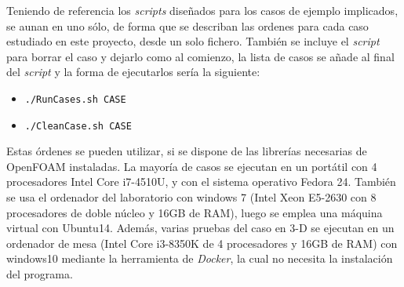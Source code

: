 Teniendo de referencia los \emph{scripts} diseñados para los casos de
ejemplo implicados, se aunan en uno sólo, de forma que se describan las
ordenes para cada caso estudiado en este proyecto, desde un solo
fichero. También se incluye el \emph{script} para borrar el caso y
dejarlo como al comienzo, la lista de casos se añade al final del
\emph{script} y la forma de ejecutarlos sería la siguiente:

\begin{itemize}
\item
  \texttt{./RunCases.sh\ CASE}
\item
  \texttt{./CleanCase.sh\ CASE}
\end{itemize}

Estas órdenes se pueden utilizar, si se dispone de las librerías
necesarias de OpenFOAM instaladas. La mayoría de casos se ejecutan en un
portátil con 4 procesadores Intel Core i7-4510U, y con el sistema
operativo Fedora 24. También se usa el ordenador del laboratorio con
windows 7 (Intel Xeon E5-2630 con 8 procesadores de doble núcleo y 16GB
de RAM), luego se emplea una máquina virtual con Ubuntu14. Además,
varias pruebas del caso en 3-D se ejecutan en un ordenador de mesa
(Intel Core i3-8350K de 4 procesadores y 16GB de RAM) con windows10
mediante la herramienta de \emph{Docker}, la cual no necesita la
instalación del programa.
